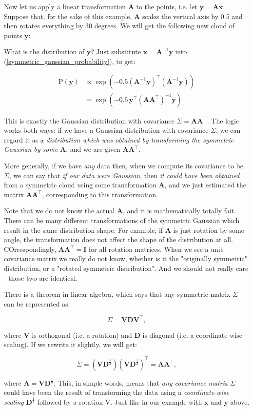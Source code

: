 \documentclass{article}
\begin{document}
Now let us apply a linear transformation $\bm{A}$ to the points, i.e. let $\bm{y} = \bm{Ax}$. Suppose that, for the sake of this example, $\bm{A}$ scales the vertical axis by 0.5 and then rotates everything by 30 degrees. We will get the following new cloud of points $\bm{y}$:


What is the distribution of $\bm{y}$? Just substitute $\bm{x}=\bm{A}^{-1}\bm{y}$ into (\ref{symmetric_gaussian_probability}), to get:

$$
  \begin{aligned}
    \text{P}(\bm{y}) &\propto \exp\left(-0.5\left(\bm{A}^{-1}\bm{y}\right)^{\intercal}\left(\bm{A}^{-1}\bm{y}\right)\right) \\
    &= \exp\left(-0.5\,\bm{y}^{\intercal}\left(\bm{A}\bm{A}^{\intercal}\right)^{-1}\bm{y}\right)
  \end{aligned}
$$

This is exactly the Gaussian distribution with covariance $\Sigma = \bm{A}\bm{A}^{\intercal}$. The logic works both ways: if we have a Gaussian distribution with covariance $\Sigma$, we can regard it as a \textit{distribution which was obtained by transforming the symmetric Gaussian by some} $\bm{A}$, and we are given $\bm{A}\bm{A}^{\intercal}$.\medskip

More generally, if we have \textit{any} data then, when we compute its covariance to be $\Sigma$, we can say that \textit{if our data were Gaussian}, then \textit{it could have been obtained} from a symmetric cloud using some transformation $\bm{A}$, and we just estimated the matrix $\bm{A}\bm{A}^{\intercal}$, corresponding to this transformation.\medskip

Note that we do not know the actual $\bm{A}$, and it is mathematically totally fait. There can be many different transformations of the symmetric Gaussian which result in the same distribution shape. For example, if $\bm{A}$ is just rotation by some angle, the transformation does not affect the shape of the distribution at all. COrrespondingly, $\bm{A}\bm{A}^{\intercal} = \bm{I}$ for all rotation matrices. When we see a unit covariance matrix we really do not know, whether is it the "originally symmetric" distribution, or a "rotated symmetric distribution". And we should not really care - those two are identical.\medskip

There is a theorem in linear algebra, which says that any symmetric matrix $\Sigma$ can be represented as:

$$
  \Sigma = \bm{V}\bm{D}\bm{V}^{\intercal},
$$

where $\bm{V}$ is orthogonal (i.e. a rotation) and $\bm{D}$ is diagonal (i.e. a coordinate-wise scaling). If we rewrite it slightly, we will get:

$$
  \Sigma = \left(\bm{V}\bm{D}^{\frac{1}{2}}\right)\left(\bm{V}\bm{D}^\frac{1}{2}\right)^{\intercal} = \bm{A}\bm{A}^{\intercal},
$$

where $\bm{A} = \bm{V}\bm{D}^{\frac{1}{2}}$. This, in simple words, means that \textit{any covariance matrix} $\Sigma$ could have been the result of transforming the data using a \textit{coordinate-wise scaling} $\bm{D}^{\frac{1}{2}}$ followed by a rotation V. Just like in our example with $\bm{x}$ and $\bm{y}$ above.
\end{document}
